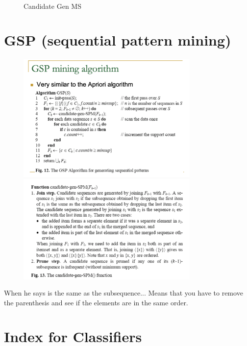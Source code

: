 \documentclass[10pt,oneside,a4paper]{article}
\begin{document}
\begin{figure}[H]
\begin{minipage}[t]{0.32\textwidth}
        \caption{Candidate Gen MS}
    \end{minipage}
\end{figure}


\section{GSP (sequential pattern mining)}
\begin{figure}[H]
    \centering
    \begin{minipage}[t]{0.5\textwidth}
        \centering
        \includegraphics[width=0.8\textwidth]{Images/GSP1.png}
    \end{minipage}%
    \hfill
    \begin{minipage}[t]{0.5\textwidth}
        \centering
        \includegraphics[width=0.8\textwidth]{Images/GSP.png}
    \end{minipage}%
\end{figure}
When he says is the same as the subsequence... Means that you have to remove the parenthesis and see if the elements are in the same order.

\section{Index for Classifiers}
\end{document}
